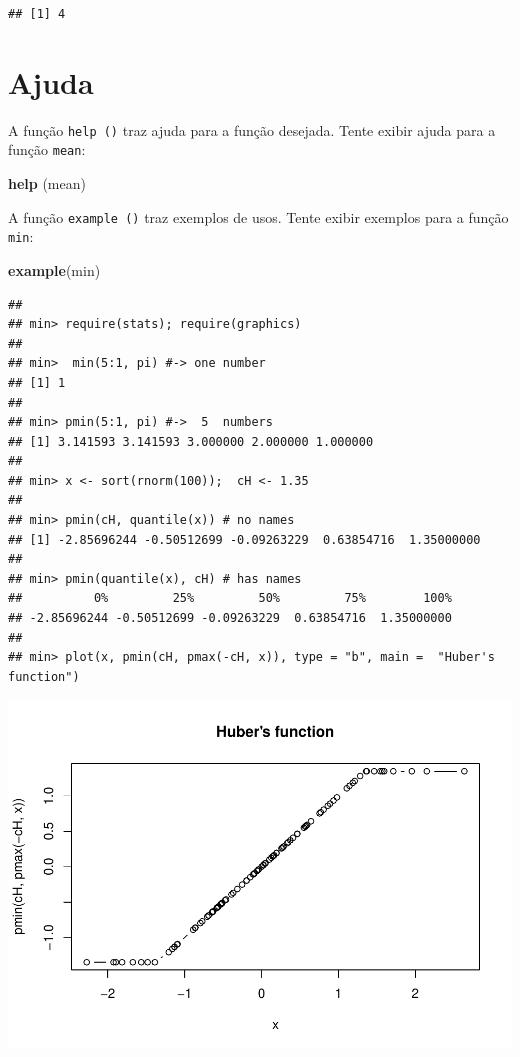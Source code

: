 \documentclass[]{book}
\newenvironment{Shaded}{\begin{snugshade}}{\end{snugshade}}
\newcommand{\KeywordTok}[1]{\textcolor[rgb]{0.13,0.29,0.53}{\textbf{#1}}}
\newcommand{\NormalTok}[1]{#1}
\begin{document}
\begin{verbatim}
## [1] 4
\end{verbatim}

\hypertarget{ajuda}{%
\section{Ajuda}\label{ajuda}}

A função \texttt{help\ ()} traz ajuda para a função desejada. Tente exibir ajuda para a função \texttt{mean}:

\begin{Shaded}
\begin{Highlighting}[]
\KeywordTok{help}\NormalTok{ (mean)}
\end{Highlighting}
\end{Shaded}

A função \texttt{example\ ()} traz exemplos de usos. Tente exibir exemplos para a função \texttt{min}:

\begin{Shaded}
\begin{Highlighting}[]
\KeywordTok{example}\NormalTok{(min)}
\end{Highlighting}
\end{Shaded}

\begin{verbatim}
## 
## min> require(stats); require(graphics)
## 
## min>  min(5:1, pi) #-> one number
## [1] 1
## 
## min> pmin(5:1, pi) #->  5  numbers
## [1] 3.141593 3.141593 3.000000 2.000000 1.000000
## 
## min> x <- sort(rnorm(100));  cH <- 1.35
## 
## min> pmin(cH, quantile(x)) # no names
## [1] -2.85696244 -0.50512699 -0.09263229  0.63854716  1.35000000
## 
## min> pmin(quantile(x), cH) # has names
##          0%         25%         50%         75%        100% 
## -2.85696244 -0.50512699 -0.09263229  0.63854716  1.35000000 
## 
## min> plot(x, pmin(cH, pmax(-cH, x)), type = "b", main =  "Huber's function")
\end{verbatim}

\includegraphics{TudodoR_files/figure-latex/unnamed-chunk-14-1.pdf}
\end{document}
